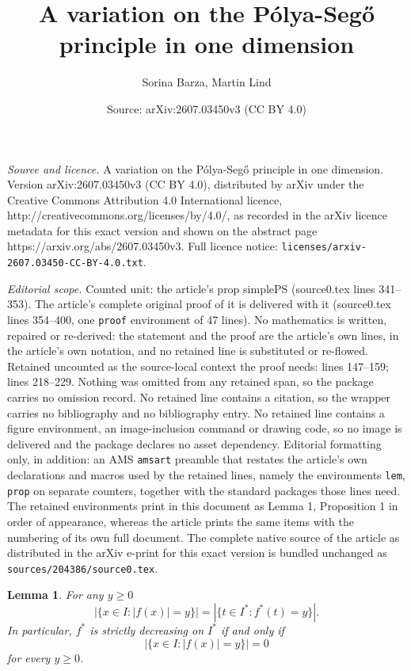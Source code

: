\documentclass[10pt,a4paper]{amsart}
\title{A variation on the P\'{o}lya-Seg\H{o} principle in one dimension}
\author{Sorina Barza, Martin Lind}
\date{Source: arXiv:2607.03450v3 (CC BY 4.0)}
\newtheorem{lem}{Lemma}
\begin{document}
\maketitle

\noindent\emph{Source and licence.} A variation on the P\'{o}lya-Seg\H{o} principle in one dimension. Version arXiv:2607.03450v3 (CC BY 4.0), distributed by arXiv under the Creative Commons Attribution 4.0 International licence, http://creativecommons.org/licenses/by/4.0/, as recorded in the arXiv licence metadata for this exact version and shown on the abstract page https://arxiv.org/abs/2607.03450v3. Full licence notice: \texttt{licenses/arxiv-2607.03450-CC-BY-4.0.txt}.\par\smallskip

\noindent\textit{Editorial scope.} Counted unit: the article's prop simplePS (source0.tex lines 341--353). The article's complete original proof of it is delivered with it (source0.tex lines 354--400, one \texttt{proof} environment of 47 lines). No mathematics is written, repaired or re-derived: the statement and the proof are the article's own lines, in the article's own notation, and no retained line is substituted or re-flowed.  Retained uncounted as the source-local context the proof needs: lines 147--159; lines 218--229.  Nothing was omitted from any retained span, so the package carries no omission record.  No retained line contains a citation, so the wrapper carries no bibliography and no bibliography entry.  No retained line contains a figure environment, an image-inclusion command or drawing code, so no image is delivered and the package declares no asset dependency.  Editorial formatting only, in addition: an AMS \texttt{amsart} preamble that restates the article's own declarations and macros used by the retained lines, namely the environments \texttt{lem}, \texttt{prop} on separate counters, together with the standard packages those lines need.  The retained environments print in this document as Lemma 1, Proposition 1 in order of appearance, whereas the article prints the same items with the numbering of its own full document.  The complete native source of the article as distributed in the arXiv e-print for this exact version is bundled unchanged as \texttt{sources/204386/source0.tex}.
\begin{lem}
    \label{decreasingLem}
    For any $y\ge0$
    \begin{equation}
        \label{eqlevelset}
        |\{x\in I:|f(x)|=y\}|=|\{t\in I^*:f^*(t)=y\}|.
    \end{equation}
    In particular, $f^*$ is strictly decreasing on $I^*$ if and only if 
    $$
    |\{x\in I:|f(x)|=y\}|=0
    $$
    for every $y\ge0$.
\end{lem}
\end{document}
